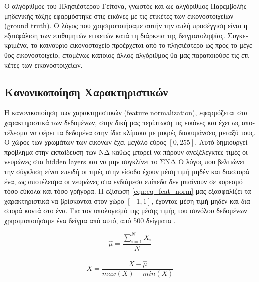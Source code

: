 \textgreek{Ο αλγόριθμος του Πλησιέστερου Γείτονα, γνωστός και ως αλγόριθμος Παρεμβολής μηδενικής τάξης εφαρμόστηκε στις εικόνες με τις ετικέτες των εικονοστοιχείων} (ground truth). \textgreek{Ο λόγος που χρησιμοποιήσαμε αυτήν την απλή προσέγγιση είναι η εξασφάλιση των επιθυμητών ετικετών κατά τη διάρκεια της δειγματοληψίας. Συγκεκριμένα, το καινούριο εικονοστοχείο προέρχεται από το πλησιέστερο ως προς το μέγεθος εικονοστοιχείο, επομένως κάποιος άλλος αλγόριθμος θα μας παραποιούσε τις ετικέτες των εικονοστοιχείων. }


\subsection{\textgreek{Κανονικοποίηση Χαρακτηριστικών}}
\textgreek{Η  κανονικοποίηση των χαρακτηριστικών }(feature normalization),\textgreek{ εφαρμόζεται στα χαρακτηριστικά των δεδομένων, στην δική μας περίπτωση τις εικόνες και έχει ως αποτέλεσμα να φέρει τα δεδομένα στην ίδια κλίμακα με μικρές διακυμάνσεις μεταξύ τους. Ο χώρος των χρωμάτων των εικόνων έχει μεγάλο εύρος $[0,255]$. Αυτό δημιουργεί πρόβλημα στην εκπαίδευση των ΝΔ καθώς μπορεί να πάρουν ανεξέλεγκτες τιμές οι νευρώνες στα }hidden layers \textgreek{και να μην συγκλίνει το ΣNΔ Ο λόγος που βελτιώνει την σύγκλιση είναι επειδή οι τιμές στην είσοδο έχουν μέση τιμή μηδέν και διασπορά ένα, ως αποτέλεσμα οι νευρώνες στα ενδιάμεσα επίπεδα δεν μπαίνουν σε κορεσμό τόσο εύκολα και τόσο γρήγορα. Η εξίσωση }\ref{eqn:eq_feat_norm} \textgreek{μας εξασφαλίζει τα χαρακτηριστικά να βρίσκονται στον χώρο $[-1,1]$, έχοντας μέση τιμή μηδέν και διασπορά κοντά στο ένα. Για τον υπολογισμό της μέσης τιμής του συνόλου δεδομένων χρησιμοποιήσαμε ένα δείγμα από αυτό, από 500 δείγματα} \cite{feat_norm}.


\begin{equation}
 \hat{\mu} = \frac{\sum_{i=1}^{N} X_{i}}{N} 
 \label{mean}
\end{equation}
\\[1cm]

\begin{equation}
 X = \frac{X - \hat{\mu}}{max(X) - min(X)}
 \label{eqn:eq_feat_norm}
\end{equation}

